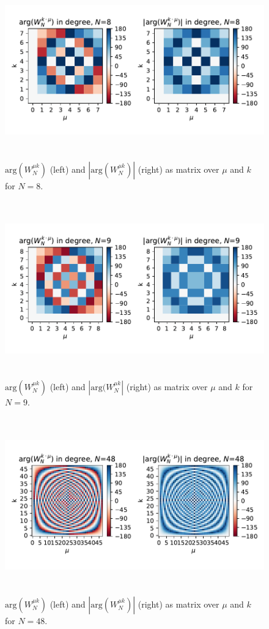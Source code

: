 \documentclass[11pt,a4paper,DIV=12]{scrartcl}
\begin{document}
\begin{figure}[b!]
		\centering
		\includegraphics[width=6in, height=3in]{graphics/TwiddleFactorMatrix_N8.pdf}
		\caption{$\text{arg}(W_N^{\mu k})$ (left) and $|\text{arg}(W_N^{\mu k})|$
		(right) as matrix over $\mu$ and $k$ for $N=8$.}
		\label{Twiddle1}
\end{figure}
\begin{figure}[t]
		\centering
		\includegraphics[width=6in, height=3in]{graphics/TwiddleFactorMatrix_N9.pdf}
		\caption{$\text{arg}(W_N^{\mu k})$ (left) and $|\text{arg}(W_N^{\mu k}|$
		(right) as matrix over $\mu$ and $k$ for $N=9$.}
		\label{Twiddle2}
\end{figure}
\begin{figure}
		\centering
		\includegraphics[width=6in, height=3in]{graphics/TwiddleFactorMatrix_N48.pdf}
		\caption{$\text{arg}(W_N^{\mu k})$ (left) and $|\text{arg}(W_N^{\mu k})|$
		(right) as matrix over $\mu$ and $k$ for $N=48$.}
		\label{Twiddle3}
\end{figure}
\end{document}
